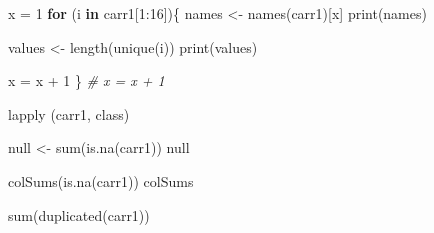 \documentclass[
]{article}
\newenvironment{Shaded}{\begin{snugshade}}{\end{snugshade}}
\newcommand{\CommentTok}[1]{\textcolor[rgb]{0.56,0.35,0.01}{\textit{#1}}}
\newcommand{\ControlFlowTok}[1]{\textcolor[rgb]{0.13,0.29,0.53}{\textbf{#1}}}
\newcommand{\DecValTok}[1]{\textcolor[rgb]{0.00,0.00,0.81}{#1}}
\newcommand{\FunctionTok}[1]{\textcolor[rgb]{0.00,0.00,0.00}{#1}}
\newcommand{\NormalTok}[1]{#1}
\newcommand{\OtherTok}[1]{\textcolor[rgb]{0.56,0.35,0.01}{#1}}
\newcommand{\SpecialCharTok}[1]{\textcolor[rgb]{0.00,0.00,0.00}{#1}}
\begin{document}
\begin{Shaded}
\begin{Highlighting}[]
\NormalTok{x }\OtherTok{=} \DecValTok{1}
\ControlFlowTok{for}\NormalTok{ (i }\ControlFlowTok{in}\NormalTok{ carr1[}\DecValTok{1}\SpecialCharTok{:}\DecValTok{16}\NormalTok{])\{}
\NormalTok{  names }\OtherTok{\textless{}{-}} \FunctionTok{names}\NormalTok{(carr1)[x]}
  \FunctionTok{print}\NormalTok{(names)}
  
\NormalTok{  values }\OtherTok{\textless{}{-}} \FunctionTok{length}\NormalTok{(}\FunctionTok{unique}\NormalTok{(i))}
  \FunctionTok{print}\NormalTok{(values)}
  
  
\NormalTok{x }\OtherTok{=}\NormalTok{ x }\SpecialCharTok{+} \DecValTok{1}  
\NormalTok{\}}
\CommentTok{\# x = x + 1}
\end{Highlighting}
\end{Shaded}

\begin{Shaded}
\begin{Highlighting}[]
\FunctionTok{lapply}\NormalTok{ (carr1, class)}
\end{Highlighting}
\end{Shaded}

\begin{Shaded}
\begin{Highlighting}[]
\NormalTok{null }\OtherTok{\textless{}{-}} \FunctionTok{sum}\NormalTok{(}\FunctionTok{is.na}\NormalTok{(carr1))}
\NormalTok{null}
\end{Highlighting}
\end{Shaded}

\begin{Shaded}
\begin{Highlighting}[]
\FunctionTok{colSums}\NormalTok{(}\FunctionTok{is.na}\NormalTok{(carr1))}
\NormalTok{colSums}
\end{Highlighting}
\end{Shaded}

\begin{Shaded}
\begin{Highlighting}[]
\FunctionTok{sum}\NormalTok{(}\FunctionTok{duplicated}\NormalTok{(carr1))}
\end{Highlighting}
\end{Shaded}
\end{document}
